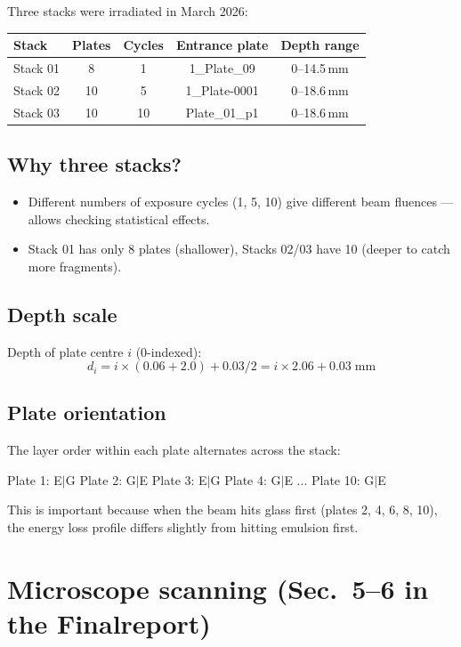 \documentclass[12pt,a4paper]{article}
\begin{document}
Three stacks were irradiated in March 2026:

\begin{tabular}{lcccc}
\toprule
Stack & Plates & Cycles & Entrance plate & Depth range \\
\midrule
Stack 01 & 8 & 1 & 1\_Plate\_09 & 0--14.5\,mm \\
Stack 02 & 10 & 5 & 1\_Plate-0001 & 0--18.6\,mm \\
Stack 03 & 10 & 10 & Plate\_01\_p1 & 0--18.6\,mm \\
\bottomrule
\end{tabular}

\subsection{Why three stacks?}
\begin{itemize}
  \item Different numbers of exposure cycles (1, 5, 10) give different
        beam fluences --- allows checking statistical effects.
  \item Stack 01 has only 8 plates (shallower), Stacks 02/03 have 10
        (deeper to catch more fragments).
\end{itemize}

\subsection{Depth scale}

Depth of plate centre $i$ (0-indexed):
\[
d_i = i \times (0.06 + 2.0) + 0.03/2 = i \times 2.06 + 0.03\;\text{mm}
\]

\subsection{Plate orientation}

The layer order within each plate alternates across the stack:
\begin{center}
Plate 1: E$|$G \quad
Plate 2: G$|$E \quad
Plate 3: E$|$G \quad
Plate 4: G$|$E \quad
... \quad
Plate 10: G$|$E
\end{center}

This is important because when the beam hits glass first (plates 2, 4,
6, 8, 10), the energy loss profile differs slightly from hitting
emulsion first.

\section{Microscope scanning (Sec.~5--6 in the Finalreport)}
\end{document}
